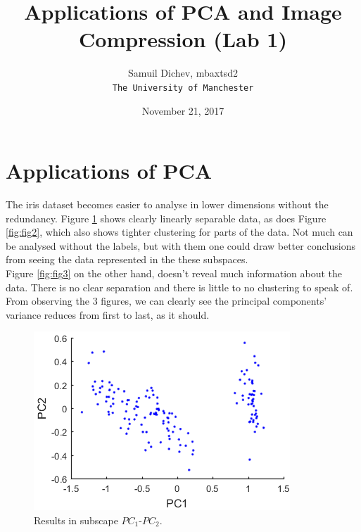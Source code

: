 \documentclass[a4paper,11pt,twocolumn]{article}
\title{Applications of PCA and Image Compression (Lab 1)}
\date{November 21, 2017}
\author{
  Samuil Dichev, mbaxtsd2\\
  \texttt{The University of Manchester}\\
}
\begin{document}
\maketitle

\section{Applications of PCA}
The iris dataset becomes easier to analyse in lower dimensions without the redundancy. Figure \ref{fig:fig1} shows clearly linearly separable data, as does Figure \ref{fig:fig2}, which also shows tighter clustering for parts of the data. Not much can be analysed without the labels, but with them one could draw better conclusions from seeing the data represented in the these subspaces.
\\Figure \ref{fig:fig3} on the other hand, doesn't reveal much information about the data. There is no clear separation and there is little to no clustering to speak of.
From observing the 3 figures, we can clearly see the principal components' variance reduces from first to last, as it should.

\begin{figure}[!h]
  \centering
  \includegraphics[width=\linewidth]{figures/PC1-PC2.png}
  \caption{Results in subscape $PC_1$-$PC_2$.}
  \label{fig:fig1}
\end{figure}
\end{document}
